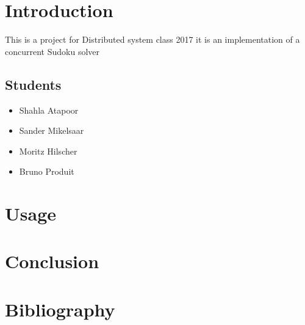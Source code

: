 \documentclass{article}
\begin{document}
  
    \section{Introduction}
    
    This is a project for Distributed system class 2017
    it is an implementation of a concurrent Sudoku solver
    \subsection{Students}
    \begin{itemize}
    \item Shahla Atapoor
    \item Sander Mikelsaar
    \item Moritz Hilscher
    \item Bruno Produit
    \end{itemize}
    
    \section{Usage}

    \section{Conclusion}
    
    \section{Bibliography}
\end{document}
